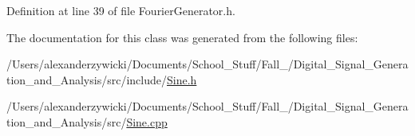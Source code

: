 Definition at line 39 of file Fourier\+Generator.\+h.



The documentation for this class was generated from the following files\+:\begin{DoxyCompactItemize}
\item 
/\+Users/alexanderzywicki/\+Documents/\+School\+\_\+\+Stuff/\+Fall\+\_/\+Digital\+\_\+\+Signal\+\_\+\+Generation\+\_\+and\+\_\+\+Analysis/src/include/\hyperlink{Sine_8h}{Sine.\+h}\item 
/\+Users/alexanderzywicki/\+Documents/\+School\+\_\+\+Stuff/\+Fall\+\_/\+Digital\+\_\+\+Signal\+\_\+\+Generation\+\_\+and\+\_\+\+Analysis/src/\hyperlink{Sine_8cpp}{Sine.\+cpp}\end{DoxyCompactItemize}
